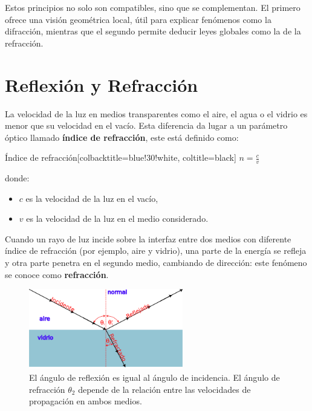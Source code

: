 Estos principios no solo son compatibles, sino que se complementan. El primero ofrece una visión geométrica local, útil para explicar fenómenos como la difracción, mientras que el segundo permite deducir leyes globales como la de la refracción.

\section{Reflexión y Refracción}

La velocidad de la luz en medios transparentes como el aire, el agua o el vidrio es menor que su velocidad en el vacío. Esta diferencia da lugar a un parámetro óptico llamado \textbf{índice de refracción}, este está definido como:

\begin{mybox}[blue]{Índice de refracción}[colbacktitle=blue!30!white, coltitle=black]
	$n = \frac{c}{v}$
\end{mybox}

donde:
\begin{itemize}
	\item $c$ es la velocidad de la luz en el vacío,
	\item $v$ es la velocidad de la luz en el medio considerado.
\end{itemize}

Cuando un rayo de luz incide sobre la interfaz entre dos medios con diferente índice de refracción (por ejemplo, aire y vidrio), una parte de la energía se refleja y otra parte penetra en el segundo medio, cambiando de dirección: este fenómeno se conoce como \textbf{refracción}.


\begin{figure}[H]		
	\centering
	\includegraphics[width=0.6\textwidth]{images/refraction_reflection.png}
	\caption{El ángulo de reflexión es igual al ángulo de incidencia. El ángulo de refracción $\theta_2$ depende de la relación entre las velocidades de propagación en ambos medios.}
	\label{fig:refraccón_reflexión_planos}
\end{figure} 

